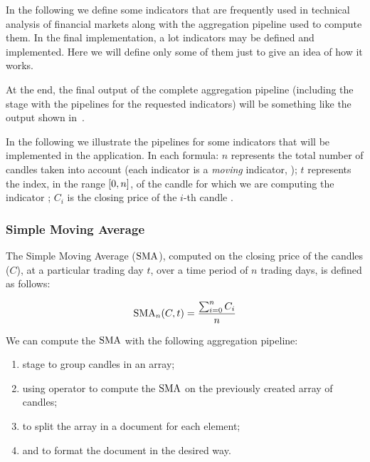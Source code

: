 In the following we define some indicators that are frequently used in technical
analysis of financial markets along with the aggregation pipeline used to
compute them. In the final implementation, a lot indicators may be defined and
implemented. Here we will define only some of them just to give an idea of how
it works.

At the end, the final output of the complete aggregation pipeline (including the
 stage with the pipelines for the requested indicators) will be
something like the output shown in~.



In the following we illustrate the pipelines for some indicators that will be
implemented in the application. In each formula: \(n\) represents the total
number of candles taken into account (each indicator is a \emph{moving}
indicator, ); \(t\) represents the index, in the range
\(\interval{0}{n}\), of the candle for which we are computing the indicator
; \(C_i\) is the
closing price of the \(i\)-th candle .

\subsubsection{Simple Moving Average}

The Simple Moving Average (\(\operatorname{SMA}\)), computed on the closing price of the
candles (\(C\)), at a particular trading day \(t\), over a time period of \(n\)
trading days, is defined as follows:

\begin{equation}\label{eq:sma}
	\operatorname{SMA}_n(C,t) = \frac{\sum_{i = 0}^n C_i}{n}
\end{equation}

We can compute the \(\operatorname{SMA}\) with the following aggregation pipeline:

\begin{enumerate}
	\item {} stage to group candles in an array;
	\item {} using  operator to compute the
		\(\operatorname{SMA}\) on the previously created array of candles;
	\item {} to split the array in a document for each element;
	\item {} and  to format the document
		in the desired way.
\end{enumerate}

